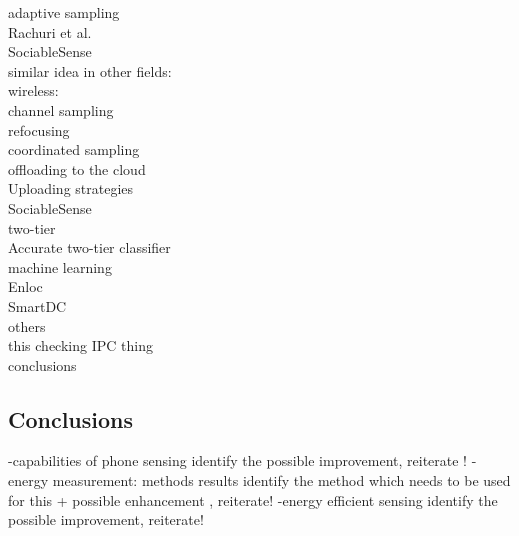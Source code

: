 adaptive sampling\\
	Rachuri et al. \cite{rachuri:dynamicsensing}\\
	SociableSense \cite{rachuri:socialsense} \\
	similar idea in other fields:\\
		wireless:\\
			channel sampling \cite{deshpande:channeling}\\
			refocusing \cite{deshpande:refocusing}\\
			coordinated sampling \cite{deshpande:coordinated}\\

offloading to the cloud\\
	Uploading strategies \cite{musolesi:offloading}\\
	SociableSense \cite{rachuri:socialsense} \\
	
two-tier\\
	Accurate two-tier classifier \cite{srinivasan:twotier}\\

machine learning\\
	Enloc \cite{constandache:enloc}\\
	SmartDC \cite{chon:smartdc}\\

others\\
	this checking IPC thing \cite{hsieh:ipc} \\

conclusions

\subsection{Conclusions}
-capabilities of phone sensing
	identify the possible improvement, reiterate !
-energy measurement:
	methods 
	results
	identify the method which needs to be used for this
		+ possible enhancement , reiterate!
-energy efficient sensing
	identify the possible improvement, reiterate!
